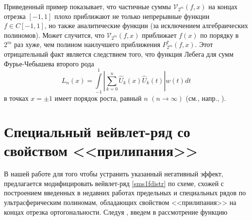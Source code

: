 Приведенный пример показывает, что частичные суммы $\mathcal{V}_{2^m}(f, x)$ на концах отрезка $[-1,1]$ плохо приближают не только непрерывные функции $f \in C[-1,1]$, но также аналитические функции (за исключением алгебраических полиномов).
Может случится, что $\mathcal{V}_{2^m}(f, x)$ приближает $f(x)$ по порядку в $2^m$ раз хуже, чем полином наилучшего приближения $P^{*}_{2^m}(f,x)$.
Этот отрицательный факт является следствием того, что функция Лебега для сумм Фурье-Чебышева второго рода
\begin{equation*}
L_{n}(x) = \int\limits_{-1}^{1}  \left|\sum\limits_{k=0}^{n}\hat U_{k}(x)\hat U_{k}(t)\right| w(t)dt
\end{equation*}
в точках $x = \pm1$ имеет порядок роста, равный $n$ $(n\to\infty)$ (см., напр., \cite{sms14}).

\section{Специальный вейвлет-ряд со свойством <<прилипания>>}

В нашей работе \cite{sms112} для того чтобы устранить указанный негативный эффект, предлагается модифицировать вейвлет-ряд \eqref{sms1fdistr} по схеме, схожей с построением введенных в недавних работах \cite{sms12,sob-leg-sharap3}
предельных и специальных рядов по ультрасферическим полиномам, обладающих свойством <<прилипания>> на концах отрезка ортогональности. Следуя \cite{sob-leg-sharap3},
введем в рассмотрение функцию

